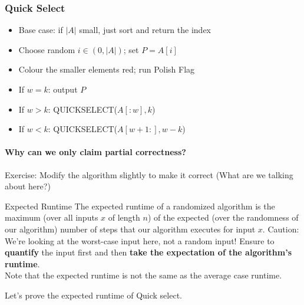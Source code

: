 \documentclass[11pt]{article}
\begin{document}
\subsubsection{Quick Select}
\begin{itemize}
    \item Base case: if $|A|$ small, just sort and return the index
    \item Choose random $i \in (0,|A|)$; set $P=A[i]$
    \item Colour the smaller elements red; run Polish Flag
    \item If $w=k$: output $P$
    \item If $w>k$: QUICKSELECT($A[:w], k$)
    \item If $w<k$: QUICKSELECT($A[w+1:], w-k$)
\end{itemize}

\paragraph{Why can we only claim partial correctness?} Exercise: Modify the algorithm slightly to
make it correct (What are we talking about here?)

\begin{definitionbox}{Expected Runtime}
    The expected runtime of a randomized algorithm is the maximum (over all inputs $x$ of length $n$)
    of the expected (over the randomness of our algorithm) number of steps that our algorithm
    executes for input $x$. Caution: We're looking at the worst-case input here, not a random input!
    Ensure to \textbf{quantify} the input first and then \textbf{take the expectation of the
    algorithm's runtime}. \\
    Note that the expected runtime is not the same as the average case runtime.
\end{definitionbox}

Let's prove the expected runtime of Quick select.
\end{document}
